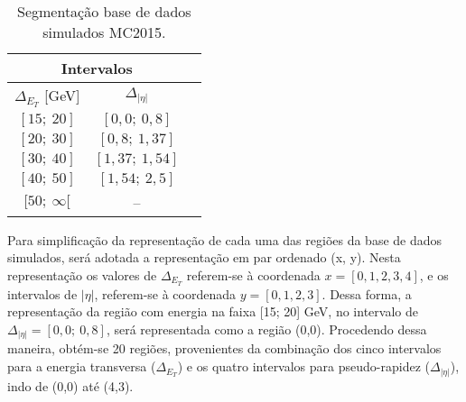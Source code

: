 \begin{table}[H]
\centering
   \caption{Segmentação base de dados simulados MC2015.}
   \label{tab:segmentacaoMC2015}
   \setlength{\extrarowheight}{4pt}       %
	\begin{tabular}{ccc} \toprule
	\multicolumn{2}{c}{\bfseries Intervalos} \\ \midrule
	  $\Delta_{E_T}$ [GeV] &   $\Delta_{|\eta|}$        \\ \cmidrule(lr){1-1}\cmidrule(lr){2-2}
		$[15;\ 20]$ & $[0,0;\ 0,8]$      \\
		$[20;\ 30]$ & $[0,8;\ 1,37]$     \\
		$[30;\ 40]$ & $[1,37;\ 1,54]$    \\
		$[40;\ 50]$ & $[1,54;\ 2,5]$ \\
		$[50;\ \infty[$ & -- \\ \bottomrule
	\end{tabular}
\end{table}

Para simplificação da representação de cada uma das regiões da base de dados simulados, será adotada a representação em par ordenado (x, y). Nesta representação os valores de $\Delta_{E_T}$ referem-se à coordenada $x=[0, 1, 2, 3, 4]$, e os intervalos de $|\eta|$, referem-se à coordenada $y = [0, 1, 2, 3]$. Dessa forma, a representação da região com energia na faixa [15; 20] GeV, no intervalo de $\Delta_{|\eta|}= [0,0;\ 0,8]$, será representada como a região (0,0). Procedendo dessa maneira, obtém-se 20 regiões, provenientes da combinação dos cinco intervalos para a energia transversa ($\Delta_{E_T}$) e os quatro intervalos para pseudo-rapidez ($\Delta_{|\eta|}$), indo de (0,0) até (4,3).



